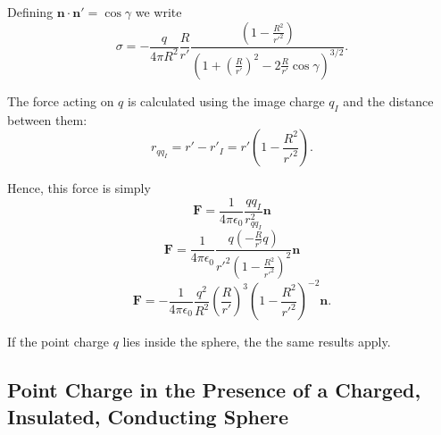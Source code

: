 Defining $\textbf{n} \cdot \textbf{n}' = \cos \gamma$ we write
  \begin{equation}
 \sigma = - \frac{q}{4 \pi R^2 } \frac{R}{r'} \frac{ \left(  1- \frac{ R^2}{r'^2  }  \right) }{ \left( 1+ \left(\frac{R}{r'}\right)^2 - 2 \frac{R}{r'} \cos \gamma \right)^{3/2} } .  \label{ConductingSphereChargeDensity}
 \end{equation} 

The force acting on $q$ is calculated using the image charge $q_I$ and the distance between them: 
\begin{equation}
r_{qq_I} = r' - r'_I = r' \left( 1 - \frac{R^2}{r'^2}\right).
\end{equation}

Hence, this force is simply
\begin{equation}
\textbf{F} = \frac{1}{4\pi \epsilon_0} \frac{qq_I}{r_{qq_I}^2} \textbf{n}
\end{equation}
\begin{equation}
\textbf{F} = \frac{1}{4\pi \epsilon_0} \frac{q \left( -\frac{R}{r'} q \right)}{r'^2 \left( 1 - \frac{R^2}{r'^2}\right)^2} \textbf{n}
\end{equation}
\begin{equation}
\textbf{F} = - \frac{1}{4\pi \epsilon_0} \frac{q^2}{R^2}  \left( \frac{R}{r'}  \right)^3 \left( 1 - \frac{R^2}{r'^2}\right)^{-2} \textbf{n}.\label{ForceImage1}
\end{equation}

If the point charge $q$ lies inside the sphere, the the same results apply.

\subsection{ Point Charge in the Presence of a Charged, Insulated, Conducting Sphere}

